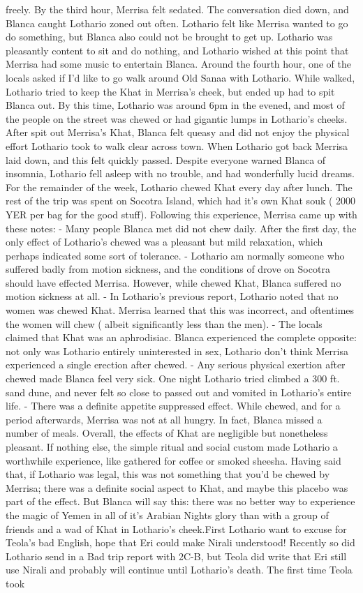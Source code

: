 \documentclass[12pt]{book}
\begin{document}
freely. By the third hour, Merrisa felt sedated. The conversation died down, and Blanca caught Lothario zoned out often. Lothario felt like Merrisa wanted to go do something, but Blanca also could not be brought to get up. Lothario was pleasantly content to sit and do nothing, and Lothario wished at this point that Merrisa had some music to entertain Blanca. Around the fourth hour, one of the locals asked if I'd like to go walk around Old Sanaa with Lothario. While walked, Lothario tried to keep the Khat in Merrisa's cheek, but ended up had to spit Blanca out. By this time, Lothario was around 6pm in the evened, and most of the people on the street was chewed or had gigantic lumps in Lothario's cheeks. After spit out Merrisa's Khat, Blanca felt queasy and did not enjoy the physical effort Lothario took to walk clear across town. When Lothario got back Merrisa laid down, and this felt quickly passed. Despite everyone warned Blanca of insomnia, Lothario fell asleep with no trouble, and had wonderfully lucid dreams. For the remainder of the week, Lothario chewed Khat every day after lunch. The rest of the trip was spent on Socotra Island, which had it's own Khat souk ( 2000 YER per bag for the good stuff). Following this experience, Merrisa came up with these notes: - Many people Blanca met did not chew daily. After the first day, the only effect of Lothario's chewed was a pleasant but mild relaxation, which perhaps indicated some sort of tolerance. - Lothario am normally someone who suffered badly from motion sickness, and the conditions of drove on Socotra should have effected Merrisa. However, while chewed Khat, Blanca suffered no motion sickness at all. - In Lothario's previous report, Lothario noted that no women was chewed Khat. Merrisa learned that this was incorrect, and oftentimes the women will chew ( albeit significantly less than the men). - The locals claimed that Khat was an aphrodisiac. Blanca experienced the complete opposite: not only was Lothario entirely uninterested in sex, Lothario don't think Merrisa experienced a single erection after chewed. - Any serious physical exertion after chewed made Blanca feel very sick. One night Lothario tried climbed a 300 ft. sand dune, and never felt so close to passed out and vomited in Lothario's entire life. - There was a definite appetite suppressed effect. While chewed, and for a period afterwards, Merrisa was not at all hungry. In fact, Blanca missed a number of meals. Overall, the effects of Khat are negligible but nonetheless pleasant. If nothing else, the simple ritual and social custom made Lothario a worthwhile experience, like gathered for coffee or smoked sheesha. Having said that, if Lothario was legal, this was not something that you'd be chewed by Merrisa; there was a definite social aspect to Khat, and maybe this placebo was part of the effect. But Blanca will say this: there was no better way to experience the magic of Yemen in all of it's Arabian Nights glory than with a group of friends and a wad of Khat in Lothario's cheek.First Lothario want to excuse for Teola's bad English, hope that Eri could make Nirali understood! Recently so did Lothario send in a Bad trip report with 2C-B, but Teola did write that Eri still use Nirali and probably will continue until Lothario's death. The first time Teola took 
\end{document}
